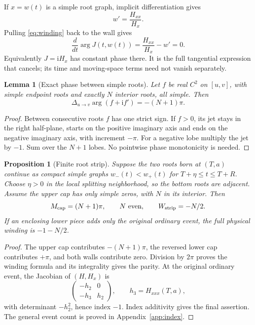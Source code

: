 \documentclass[11pt]{article}
\newtheorem{proposition}[theorem]{Proposition}
\newtheorem{lemma}[theorem]{Lemma}
\theoremstyle{definition}
\newcommand{\ii}{\mathrm i}
\begin{document}
If \(x=w(t)\) is a simple root graph, implicit differentiation gives
\[
 w'=\frac{H_{xx}}{H_x}.
\]
Pulling \eqref{eq:winding} back to the wall gives
\[
 \frac{d}{dt}\arg J(t,w(t))
 =\frac{H_{xx}}{H_x}-w'=0.
\]
Equivalently \(J=\ii H_x\) has constant phase there. It is the full
tangential expression that cancels; its time and moving-space terms
need not vanish separately.

\begin{lemma}[Exact phase between simple roots]\label{lem:cap}
Let \(f\) be real \(C^2\) on \([u,v]\), with simple endpoint roots and
exactly \(N\) interior roots, all simple. Then
\[
 \Delta_{u\to v}\arg(f+\ii f')=-(N+1)\pi.
\]
\end{lemma}
\begin{proof}
Between consecutive roots \(f\) has one strict sign. If \(f>0\), its
jet stays in the right half-plane, starts on the positive imaginary
axis and ends on the negative imaginary axis, with increment \(-\pi\).
For a negative lobe multiply the jet by \(-1\). Sum over the \(N+1\)
lobes. No pointwise phase monotonicity is needed.
\end{proof}

\begin{proposition}[Finite root strip]\label{prop:strip}
Suppose the two roots born at \((T,a)\) continue as compact simple graphs
\(w_-(t)<w_+(t)\) for \(T+\eta\le t\le T+R\). Choose \(\eta>0\)
in the local splitting neighborhood, so the bottom roots are adjacent.
Assume the upper cap has only simple zeros, with \(N\) in its interior.
Then
\begin{equation}
 M_{\rm cap}=(N+1)\pi,\qquad N\ \hbox{even},\qquad
 W_{\rm strip}=-N/2.                              \label{eq:strip}
\end{equation}
If an enclosing lower piece adds only the original ordinary event,
the full physical winding is \(-1-N/2\).
\end{proposition}
\begin{proof}
The upper cap contributes \(-(N+1)\pi\), the reversed lower cap
contributes \(+\pi\), and both walls contribute zero. Division by
\(2\pi\) proves the winding formula and its integrality gives the parity.
At the original ordinary event, the Jacobian of \((H,H_x)\) is
\[
 \begin{pmatrix}-h_2&0\\-h_3&h_2\end{pmatrix},
 \qquad h_3=H_{xxx}(T,a),
\]
with determinant \(-h_2^2\), hence index \(-1\).
Index additivity gives the final assertion. The general event count
is proved in Appendix~\ref{app:index}.
\end{proof}
\end{document}
